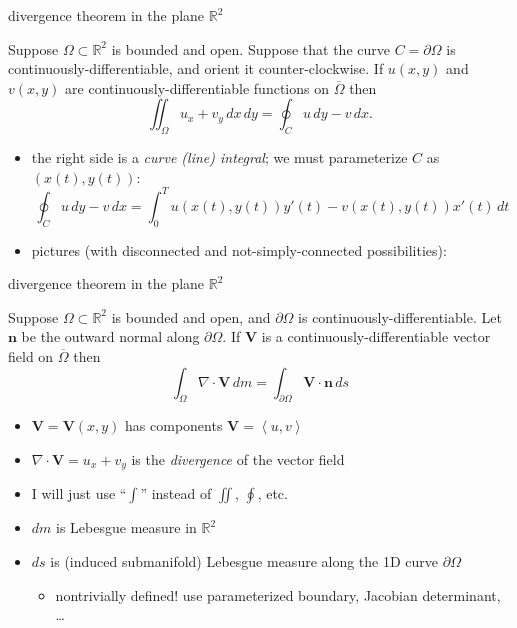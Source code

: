 \documentclass[10pt,
               svgnames,
               hyperref={colorlinks,
                         citecolor=DeepPink4,
                         linkcolor=FireBrick,
                         urlcolor=blue},
               usepdftitle=false]{beamer}
\newcommand{\bn}{\mathbf{n}}
\newcommand{\bV}{\mathbf{V}}
\newcommand{\RR}{\mathbb{R}}
\newcommand{\Div}{\nabla\cdot}
\newcommand{\ip}[2]{\left<#1,#2\right>}
\begin{document}
\begin{frame}{divergence theorem in the plane $\RR^2$}

\begin{theorem}
Suppose $\Omega\subset\RR^2$ is bounded and open.  Suppose that the curve $C=\partial \Omega$ is continuously-differentiable, and orient it counter-clockwise.  If $u(x,y)$ and $v(x,y)$ are continuously-differentiable functions on $\overline{\Omega}$ then
	$$\iint_\Omega u_x + v_y \,dx\,dy = \oint_{C} u\, dy - v\, dx.$$
\end{theorem}

{\small
\begin{itemize}
\item the right side is a \emph{curve (line) integral}; we must parameterize $C$ as $(x(t),y(t))$:
  $$\oint_{C} u\, dy - v\, dx = \int_0^T u(x(t),y(t)) y'(t) - v(x(t),y(t)) x'(t)\,dt$$
\item pictures (with disconnected and not-simply-connected possibilities):

\vspace{25mm}
\end{itemize}
}
\end{frame}


\begin{frame}{divergence theorem in the plane $\RR^2$}

\begin{theorem}
Suppose $\Omega\subset\RR^2$ is bounded and open, and $\partial \Omega$ is continuously-differentiable.  Let $\bn$ be the outward normal along $\partial \Omega$.  If $\bV$ is a continuously-differentiable vector field on $\overline{\Omega}$ then
	$$\int_\Omega \Div \bV\,dm = \int_{\partial\Omega} \bV\cdot \bn\,ds$$
\end{theorem}

\begin{itemize}
\item $\bV=\bV(x,y)$ has components $\bV=\ip{u}{v}$
\item \alert{$\Div \bV = u_x + v_y$} is the \emph{divergence} of the vector field
\item I will just use ``$\int$'' instead of $\iint$, $\oint$, etc.
\item $dm$ is Lebesgue measure in $\RR^2$
\item $ds$ is (induced submanifold) Lebesgue measure along the 1D curve $\partial\Omega$
    \begin{itemize}
    \item[$\circ$] nontrivially defined! use parameterized boundary, Jacobian determinant, \dots
    \end{itemize}
\end{itemize}
\end{frame}
\end{document}
